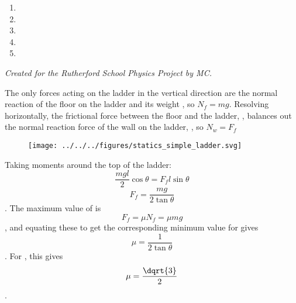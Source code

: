 
\begin{problem} 
{

\begin{enumerate}

\item {}
\item {}
\item {}
\item {}\correct
\item {}

\end{enumerate}
}
{\textit{Created for the Rutherford School Physics Project by MC.}}
{ The only forces acting on the ladder in the vertical direction are the normal reaction of the floor on the ladder  and its weight  , so $N_f = mg$. Resolving horizontally, the frictional force between the floor and the ladder,  , balances out the normal reaction force of the wall on the ladder,  , so $N_w = F_f$

\begin{figure}[h]
\centering
\texttt{[image: ../../../figures/statics\_simple\_ladder.svg]}
\caption{} \label{fig:statics_simple_ladder}
\end{figure}

Taking moments around the top of the ladder: \begin{equation*} \frac{mgl}{2}\cos\theta = F_f l \sin\theta\end{equation*}
\begin{equation*} F_f = \frac{mg}{2\tan\theta}\end{equation*}. The maximum value of  is \begin{equation*} F_f = \mu N_f = \mu mg\end{equation*}, and equating these to get the corresponding minimum value for \vari{\mu} gives \begin{equation*} \mu = \frac{1}{2\tan\theta}\end{equation*}. For , this gives \begin{equation*} \mu = \frac{\dqrt{3}}{2}\end{equation*}.
}
\end{problem}